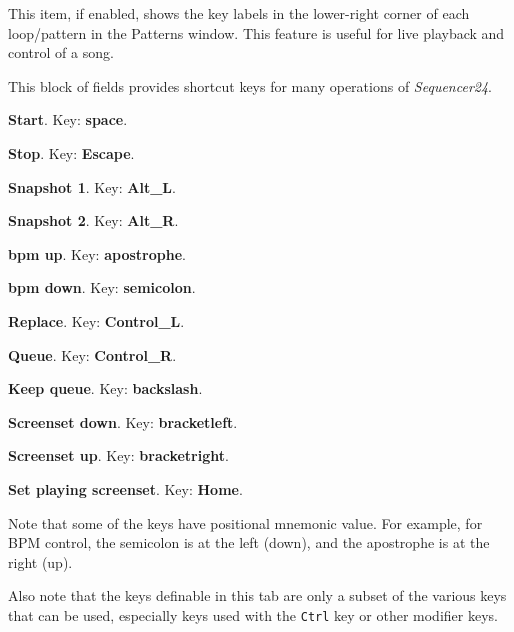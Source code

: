    \setcounter{ItemCounter}{0}      %

   This item, if enabled, shows the key labels in the lower-right corner of
   each loop/pattern in the Patterns window.  This feature is useful
   for live playback and control of a song.

   This block of fields provides shortcut keys for many operations of
   \textsl{Sequencer24}.

   \begin{enumber}
      \item \textbf{Start}.
         Key:  \textbf{space}.
      \item \textbf{Stop}.
         Key:  \textbf{Escape}.
      \item \textbf{Snapshot 1}.
         Key:  \textbf{Alt\_L}.
      \item \textbf{Snapshot 2}.
         Key:  \textbf{Alt\_R}.
      \item \textbf{bpm up}.
         Key:  \textbf{apostrophe}.
      \item \textbf{bpm down}.
         Key:  \textbf{semicolon}.
      \item \textbf{Replace}.
         Key:  \textbf{Control\_L}.
      \item \textbf{Queue}.
         Key:  \textbf{Control\_R}.
      \item \textbf{Keep queue}.
         Key:  \textbf{backslash}.
      \item \textbf{Screenset down}.
         Key: \index{keys![} \textbf{bracketleft}.
      \item \textbf{Screenset up}.
         Key: \index{keys!]} \textbf{bracketright}.
      \item \textbf{Set playing screenset}.
         Key:  \textbf{Home}.
   \end{enumber}

   Note that some of the keys have positional mnemonic value.  For example,
   for BPM control, the semicolon is at the left (down), and the apostrophe
   is at the right (up).

   Also note that the keys definable in this tab are only a subset of the
   various keys that can be used, especially keys used with the
   \texttt{Ctrl} key or other modifier keys.

